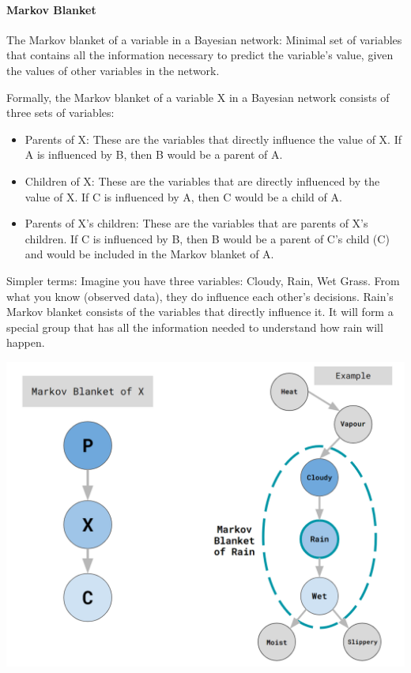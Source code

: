 \documentclass{article}
\begin{document}
\paragraph{Markov Blanket}
The Markov blanket of a variable in a Bayesian network: Minimal set of variables that contains all the information necessary to predict the variable's value, given the values of other variables in the network.

Formally, the Markov blanket of a variable X in a Bayesian network consists of three sets of variables:
\begin{itemize}
  \item Parents of X: These are the variables that directly influence the value of X. If A is influenced by B, then B would be a parent of A.
  \item Children of X: These are the variables that are directly influenced by the value of X. If C is influenced by A, then C would be a child of A.
  \item Parents of X's children: These are the variables that are parents of X's children. If C is influenced by B, then B would be a parent of C's child (C) and would be included in the Markov blanket of A.
\end{itemize}

Simpler terms: Imagine you have three variables: Cloudy, Rain, Wet Grass. 
From what you know (observed data), they do influence each other's decisions. Rain's Markov blanket consists of the variables that directly influence it. It will form a special group that has all the information needed to understand how rain will happen.

\includegraphics[width=\textwidth,height=\textheight,keepaspectratio]{mb.png}
\end{document}
